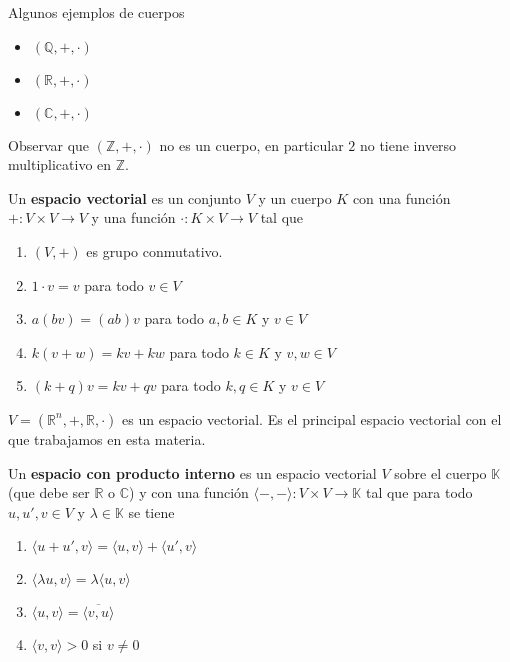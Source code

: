 \begin{example}

Algunos ejemplos de cuerpos

\begin{itemize}

\item $ (\mathbb{Q}, +, \cdot)$
\item $ (\mathbb{R}, +, \cdot)$ 
\item $(\mathbb{C}, +, \cdot)$

\end{itemize}

\end{example}

Observar que $ (\mathbb{Z}, +, \cdot)$ no es un cuerpo, en particular $ 2$ no tiene inverso multiplicativo en $ \mathbb{Z}$.

\begin{definition} 

Un \textbf{espacio vectorial} \label{ev} es un conjunto $V$ y un cuerpo $K$ con una función $+ : V \times V \to V$ y una función $ \cdot : K \times V \to V$ tal que

\begin{enumerate}
\item $ (V,+)$ es grupo conmutativo.
\item $ 1 \cdot v = v$ para todo $ v \in V$
\item $ a(bv) = (ab)v$ para todo $ a,b \in K$ y $ v \in V$
\item $ k(v+w) = kv + kw$ para todo $ k \in K$ y $ v,w \in V$
\item $ (k+q)v = kv + qv$ para todo $ k,q \in K$ y $ v \in V$
\end{enumerate}

\end{definition}

\begin{example}
$ V = (\mathbb{R}^n, +, \mathbb{R}, \cdot)$ es un espacio vectorial.  Es el principal espacio vectorial con el que trabajamos en esta materia.
\end{example}

\begin{definition} 

Un \textbf{espacio con producto interno} \label{evpi} es un espacio vectorial $ V$ sobre el cuerpo $ \mathbb{K}$ (que debe ser $ \mathbb{R}$ o $ \mathbb{C}$) y con una función $ \langle - , - \rangle : V \times V \to \mathbb{K}$ tal que para todo $ u, u', v \in V$ y $ \lambda \in \mathbb{K}$ se tiene

\begin{enumerate}
\item $ \langle u + u', v \rangle = \langle u,v \rangle + \langle u', v \rangle $

\item $ \langle \lambda u, v \rangle = \lambda \langle u,v \rangle $

\item $ \langle u,v \rangle = \overline{ \langle v,u \rangle } $

\item $ \langle v,v \rangle > 0$ si $ v \neq 0$
\end{enumerate}
\end{definition}

